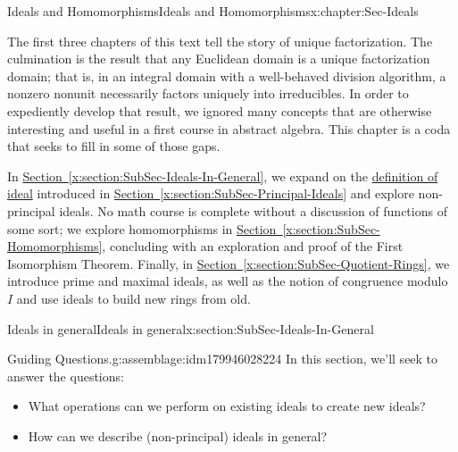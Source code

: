 \documentclass[oneside,10pt,]{book}
\newcommand{\xreffont}{\relax}
\numberwithin{equation}{section}
\begin{document}
%
%
\typeout{************************************************}
\typeout{************************************************}
%
\begin{chapterptx}{Ideals and Homomorphisms}{}{Ideals and Homomorphisms}{}{}{x:chapter:Sec-Ideals}
\begin{introduction}{}%
The first three chapters of this text tell the story of unique factorization. The culmination is the result that any Euclidean domain is a unique factorization domain; that is, in an integral domain with a well-behaved division algorithm, a nonzero nonunit necessarily factors uniquely into irreducibles. In order to expediently develop that result, we ignored many concepts that are otherwise interesting and useful in a first course in abstract algebra. This chapter is a coda that seeks to fill in some of those gaps.%
\par
In \hyperref[x:section:SubSec-Ideals-In-General]{Section~{\xreffont\ref{x:section:SubSec-Ideals-In-General}}}, we expand on the \hyperref[x:definition:def-ideal]{definition of ideal} introduced in \hyperref[x:section:SubSec-Principal-Ideals]{Section~{\xreffont\ref{x:section:SubSec-Principal-Ideals}}} and explore non-principal ideals. No math course is complete without a discussion of functions of some sort; we explore homomorphisms in \hyperref[x:section:SubSec-Homomorphisms]{Section~{\xreffont\ref{x:section:SubSec-Homomorphisms}}}, concluding with an exploration and proof of the First Isomorphism Theorem. Finally, in \hyperref[x:section:SubSec-Quotient-Rings]{Section~{\xreffont\ref{x:section:SubSec-Quotient-Rings}}}, we introduce prime and maximal ideals, as well as the notion of congruence modulo \(I\) and use ideals to build new rings from old.%
\end{introduction}%
%
%
\typeout{************************************************}
\typeout{************************************************}
%
\begin{sectionptx}{Ideals in general}{}{Ideals in general}{}{}{x:section:SubSec-Ideals-In-General}
\begin{assemblage}{Guiding Questions.}{g:assemblage:idm179946028224}%
In this section, we'll seek to answer the questions: %
\begin{itemize}[label=\textbullet]
\item{}What operations can we perform on existing ideals to create new ideals?%
\item{}How can we describe (non-principal) ideals in general?%

\end{itemize}
\end{assemblage}
\end{sectionptx}
\end{chapterptx}
\end{document}
